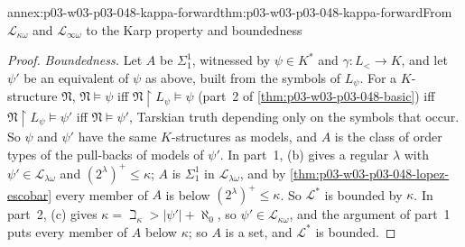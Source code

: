 \begin{annexitem}{annex:p03-w03-p03-048-kappa-forward}{thm:p03-w03-p03-048-kappa-forward}{From \(\mathcal L_{\kappa\omega}\) and \(\mathcal L_{\infty\omega}\) to the Karp property and boundedness}
\begin{proof}
\emph{Boundedness.}  Let \(A\) be \(\Sigma^1_1\), witnessed by \(\psi\in
K^{\ast}\) and \(\gamma:L_{<}\to K\), and let \(\psi'\) be an equivalent of
\(\psi\) as above, built from the symbols of \(L_\psi\).  For a
\(K\)-structure \(\mathfrak N\), \(\mathfrak N\models\psi\) iff
\(\mathfrak N\restriction L_\psi\models\psi\) (part~2 of
\cref{thm:p03-w03-p03-048-basic}) iff \(\mathfrak N\restriction L_\psi
\models\psi'\) iff \(\mathfrak N\models\psi'\), Tarskian truth depending
only on the symbols that occur.  So \(\psi\) and \(\psi'\) have the same
\(K\)-structures as models, and \(A\) is the class of order types of the
pull-backs of models of \(\psi'\).  In part~1, (b) gives a regular
\(\lambda\) with \(\psi'\in\mathcal L_{\lambda\omega}\) and
\((2^{\lambda})^{+}\leq\kappa\); \(A\) is \(\Sigma^1_1\) in
\(\mathcal L_{\lambda\omega}\), and by
\cref{thm:p03-w03-p03-048-lopez-escobar} every member of \(A\) is below
\((2^{\lambda})^{+}\leq\kappa\).  So \(\mathcal L^{\ast}\) is bounded by
\(\kappa\).  In part~2, (c) gives \(\kappa=\beth_\kappa>|\psi'|+\aleph_0\),
so \(\psi'\in\mathcal L_{\kappa\omega}\), and the argument of part~1 puts
every member of \(A\) below \(\kappa\); so \(A\) is a set, and
\(\mathcal L^{\ast}\) is bounded.
\end{proof}
\end{annexitem}

